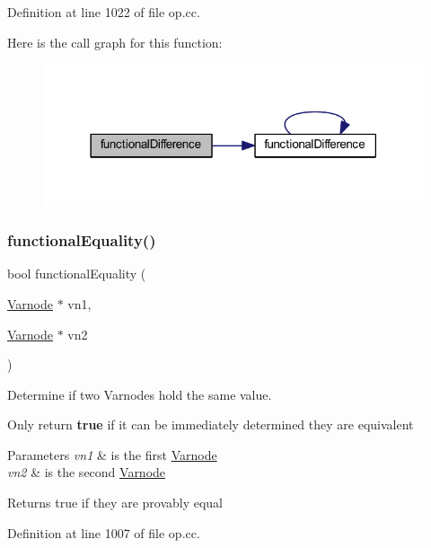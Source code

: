 Definition at line 1022 of file op.\+cc.

Here is the call graph for this function\+:
\nopagebreak
\begin{figure}[H]
\begin{center}
\leavevmode
\includegraphics[width=318pt]{op_8hh_aa4d21476a58095d82737e3bb10e64701_cgraph}
\end{center}
\end{figure}
\mbox{\label{op_8hh_acabcf7c5d200986ab0afdbf80b7bd933}} 
\subsubsection{\texorpdfstring{functionalEquality()}{functionalEquality()}}
{\footnotesize\ttfamily bool functional\+Equality (\begin{DoxyParamCaption}\item[{\mbox{\hyperlink{class_varnode}{Varnode}} $\ast$}]{vn1,  }\item[{\mbox{\hyperlink{class_varnode}{Varnode}} $\ast$}]{vn2 }\end{DoxyParamCaption})}



Determine if two Varnodes hold the same value. 

Only return {\bfseries{true}} if it can be immediately determined they are equivalent 
\begin{DoxyParams}{Parameters}
{\em vn1} & is the first \mbox{\hyperlink{class_varnode}{Varnode}} \\
\hline
{\em vn2} & is the second \mbox{\hyperlink{class_varnode}{Varnode}} \\
\hline
\end{DoxyParams}
\begin{DoxyReturn}{Returns}
true if they are provably equal 
\end{DoxyReturn}


Definition at line 1007 of file op.\+cc.

